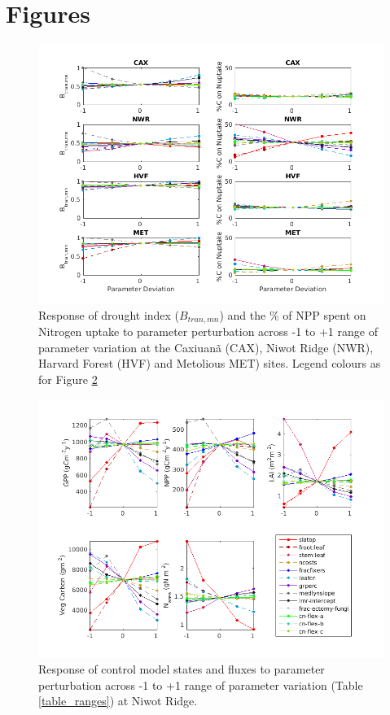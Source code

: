 \documentclass[draft,linenumbers]{agujournal}
\begin{document}
\section{Figures}
\begin{figure}[h]
     \includegraphics[width=1.2\textwidth]{matlab/figures/btran_npp.png}
     \caption{Response of drought index ($B_{tran,mn}$) and the \% of NPP spent on Nitrogen uptake to parameter perturbation across -1 to +1 range of parameter variation at the Caxiuan\~a (CAX), Niwot Ridge (NWR), Harvard Forest (HVF) and Metolious MET) sites. Legend colours as for Figure \ref{NR1 state}}
     \label{btran state}
 \end{figure}
 
 \begin{figure}[h]
     \includegraphics[width=1.2\textwidth]{matlab/figures/NOVc_STATE_1CLM50defpft_trans_1x1pt_US-NR1_ens_MIC_y1_2012.png}
     \caption{Response of control model states and fluxes to parameter perturbation across -1 to +1 range of parameter variation (Table \ref{table_ranges}) at Niwot Ridge.}
     \label{NR1 state}
 \end{figure}
\end{document}
